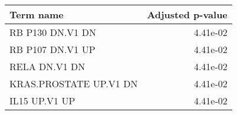 \begin{tabular}{lr}
\toprule
              Term name &  Adjusted p-value \\
\midrule
       RB P130 DN.V1 DN &          4.41e-02 \\
       RB P107 DN.V1 UP &          4.41e-02 \\
          RELA DN.V1 DN &          4.41e-02 \\
 KRAS.PROSTATE UP.V1 DN &          4.41e-02 \\
          IL15 UP.V1 UP &          4.41e-02 \\
\bottomrule
\end{tabular}
